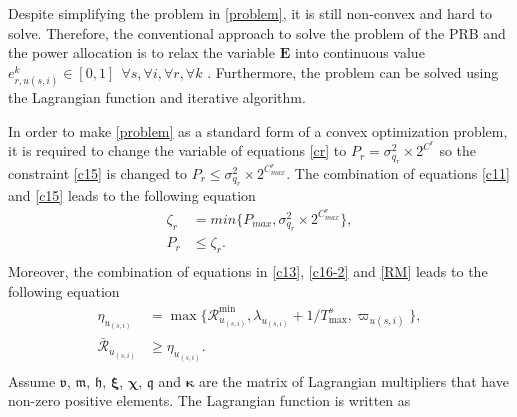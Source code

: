 \documentclass[lettersize,journal]{IEEEtran}
\begin{document}
Despite simplifying the problem in \eqref{problem}, it is still non-convex and hard to solve.
Therefore, the conventional approach to solve the problem of the PRB and the power allocation is to relax the variable $\mathbf{E}$ into continuous value $e_{r,u(s,i)}^k \in [0,1] \:\: \forall s , \forall i ,\forall r, \forall k$ \cite{lee2018dynamic,ali2018joint}.
Furthermore, the problem can be solved using the Lagrangian function and iterative algorithm.

In order to make \eqref{problem} as a standard form of a convex optimization problem, it is required to change the variable of equations \eqref{cr} to $P_r = \sigma_{q_r}^2\times 2^{C^r}$ so the constraint 
\eqref{c15} is changed to
 $P_r \leq \sigma_{q_r}^2\times 2^{C^r_{max}}$.
The combination of equations \eqref{c11} and \eqref{c15} leads to the following equation
\begin{equation} \label{pr11}
\begin{split}
\zeta_{r}&= min\{P_{max}, \sigma_{q_r}^2\times 2^{C^r_{max}} \}, \\
P_r &\leq  \zeta_{r}.\\
\end{split}
\end{equation} 
Moreover, the combination of equations in \eqref{c13}, \eqref{c16-2} and \eqref{RM} leads to the following equation
\begin{equation}\label{RConstr}
\begin{split}
\eta_{u_{(s,i)}}&= \max\{\mathcal{R}_{u_{(s,i)}}^{\min}, \lambda_{u_{(s,i)}}+1/T^s_{\max}, \varpi_{u(s,i)} \}, \\
\mathcal{\bar{R}}_{u_{(s,i)}} &\geq  \eta_{u_{(s,i)}}.\\
\end{split}
\end{equation}
Assume $\boldsymbol{\mathfrak{v}}$, $\boldsymbol{\mathfrak{m}}$, $\boldsymbol{\mathfrak{h}}$, $\boldsymbol{\xi}$, $\boldsymbol{\chi}$, $\boldsymbol{\mathfrak{q}}$ and $\boldsymbol{ \kappa}$ are the matrix of Lagrangian multipliers that have non-zero positive elements. The Lagrangian function is written as 
\end{document}
